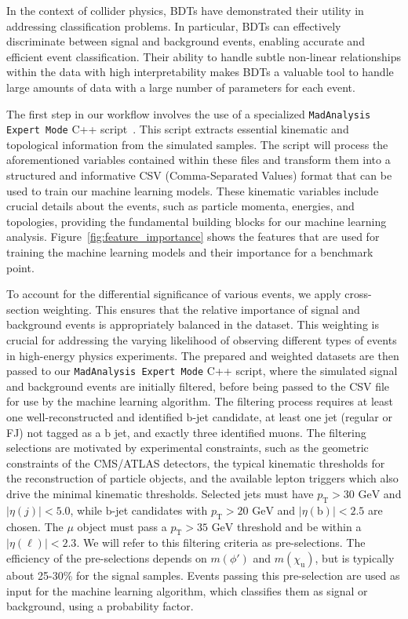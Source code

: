 In the context of collider physics, BDTs have demonstrated their utility in addressing classification problems. In particular, BDTs can effectively discriminate between signal and background events, enabling accurate and efficient event classification. Their ability to handle subtle non-linear relationships within the data with high interpretability makes BDTs a valuable tool to handle large amounts of data with a large number of parameters for each event. 

The first step in our workflow involves the use of a specialized \texttt{MadAnalysis Expert Mode} C++ script~\parencite{CONTE2013222}. This script extracts essential kinematic and topological information from the simulated samples. The script will process the aforementioned variables contained within these files and transform them into a structured and informative CSV (Comma-Separated Values) format that can be used to train our machine learning models. These kinematic variables include crucial details about the events, such as particle momenta, energies, and topologies, providing the fundamental building blocks for our machine learning analysis. Figure~\ref{fig:feature_importance} shows the features that are used for training the machine learning models and their importance for a benchmark point.

To account for the differential significance of various events, we apply cross-section weighting. This ensures that the relative importance of signal and background events is appropriately balanced in the dataset. This weighting is crucial for addressing the varying likelihood of observing different types of events in high-energy physics experiments. The prepared and weighted datasets are then passed to our \texttt{MadAnalysis Expert Mode} C++ script, where the simulated signal and background events are initially filtered, before being passed to the CSV file for use by the machine learning algorithm. The filtering process requires at least one well-reconstructed and identified $\mathrm{b}$-jet candidate, at least one jet (regular or FJ) not tagged as a $\mathrm{b}$ jet, and exactly three identified muons. The filtering selections are motivated by experimental constraints, such as the geometric constraints of the CMS/ATLAS detectors, the typical kinematic thresholds for the reconstruction of particle objects, and the available lepton triggers which also drive the minimal kinematic thresholds. Selected jets must have $p_{\mathrm{T}} > 30$ $\textrm{GeV}$ and $|\eta(j)| < 5.0$, while $\mathrm{b}$-jet candidates with $p_{\mathrm{T}} > 20$ $\textrm{GeV}$ and $|\eta(\mathrm{b})| < 2.5$ are chosen. The $\mu$ object must pass a $p_{\mathrm{T}} > 35$ $\textrm{GeV}$ threshold and be within a $|\eta(\ell)| < 2.3$. We will refer to this filtering criteria as pre-selections. The efficiency of the pre-selections depends on $m(\phi')$ and $m(\chi_{\mathrm{u}})$, but is typically about 25-30\% for the signal samples. Events passing this pre-selection are used as input for the machine learning algorithm, which classifies them as signal or background, using a probability factor. 

